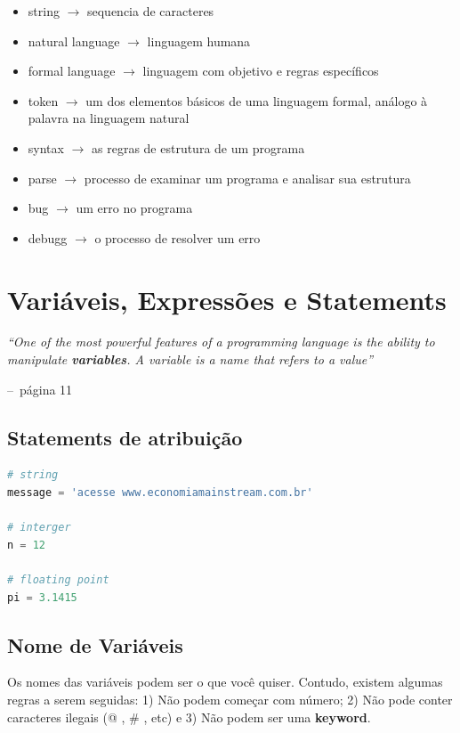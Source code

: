 \documentclass[a4paper,11pt]{book}
\makeatletter
\newenvironment{chapquote}[2][2em]
  {\setlength{\@tempdima}{#1}%
   \def\chapquote@author{#2}%
   \parshape 1 \@tempdima \dimexpr\textwidth-2\@tempdima\relax%
   \itshape}
  {\par\normalfont\hfill--\ \chapquote@author\hspace*{\@tempdima}\par\bigskip}
\makeatother
\begin{document}
\begin{itemize}
	\item string $\rightarrow$ sequencia de caracteres
	\item natural language $\rightarrow$ linguagem humana
	\item formal language $\rightarrow$ linguagem com objetivo e regras específicos
	\item token $\rightarrow$ um dos elementos básicos de uma linguagem formal, análogo à palavra na linguagem natural
	\item syntax $\rightarrow$ as regras de estrutura de um programa
	\item parse $\rightarrow$ processo de examinar um programa e analisar sua estrutura
	\item bug $\rightarrow$ um erro no programa
	\item debugg $\rightarrow$ o processo de resolver um erro
\end{itemize}

\chapter{Variáveis, Expressões e Statements}

\begin{chapquote}{página 11}
	``One of the most powerful features of a programming language is the ability to manipulate \textbf{variables}. A variable is a name that refers to a value''
\end{chapquote}

\section{Statements de atribuição}
\begin{lstlisting}[language=Python, caption=Atribuições para diferentes classes]
# string
message = 'acesse www.economiamainstream.com.br'

# interger
n = 12

# floating point
pi = 3.1415
\end{lstlisting}

\section{Nome de Variáveis}
Os nomes das variáveis podem ser o que você quiser. Contudo, existem algumas regras a serem seguidas: 1) Não podem começar com número; 2) Não pode conter caracteres ilegais (@ , \# ,  etc) e 3) Não podem ser uma \textbf{keyword}.
\end{document}

